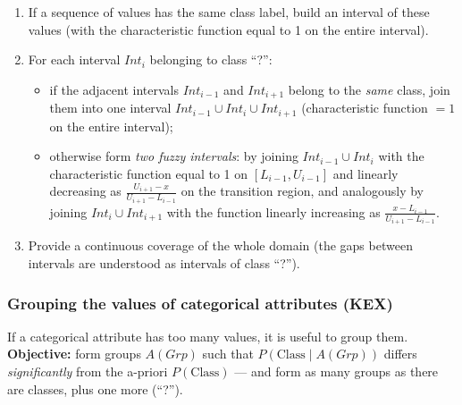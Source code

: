 \documentclass[11pt,a4paper]{article}
\theoremstyle{definition}
\providecommand{\uv}[1]{``#1''}
\begin{document}
\begin{defbox}
\begin{enumerate}
\item If a sequence of values has the same class label, build an interval of these values (with
      the characteristic function equal to 1 on the entire interval).
\item For each interval $\mathit{Int}_i$ belonging to class \uv{?}:
      \begin{itemize}
      \item if the adjacent intervals $\mathit{Int}_{i-1}$ and $\mathit{Int}_{i+1}$ belong to
            the \emph{same} class, join them into one interval
            $\mathit{Int}_{i-1}\cup \mathit{Int}_i\cup \mathit{Int}_{i+1}$ (characteristic
            function $=1$ on the entire interval);
      \item otherwise form \emph{two fuzzy intervals}: by joining $\mathit{Int}_{i-1}\cup
            \mathit{Int}_i$ with the characteristic function equal to 1 on $[L_{i-1},U_{i-1}]$
            and linearly decreasing as $\frac{U_{i+1}-x}{U_{i+1}-L_{i-1}}$ on the transition
            region, and analogously by joining $\mathit{Int}_i\cup \mathit{Int}_{i+1}$ with the
            function linearly increasing as $\frac{x-L_{i-1}}{U_{i+1}-L_{i-1}}$.
      \end{itemize}
\item Provide a continuous coverage of the whole domain (the gaps between intervals are
      understood as intervals of class \uv{?}).
\end{enumerate}
\end{defbox}

\subsubsection{Grouping the values of categorical attributes (KEX)}

If a categorical attribute has too many values, it is useful to group them.
\textbf{Objective:} form groups $A(\mathit{Grp})$ such that
$P(\mathrm{Class}\mid A(\mathit{Grp}))$ differs \emph{significantly} from the a-priori
$P(\mathrm{Class})$ --- and form as many groups as there are classes, plus one more (\uv{?}).
\end{document}
